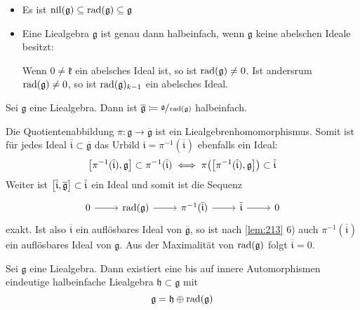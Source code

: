 \begin{bemerkung*}
	\begin{itemize}
		\item Es ist $\nil(\mathfrak{g}) \subseteq \rad(\mathfrak{g}) \subseteq \mathfrak{g}$
		\item Eine Liealgebra $\mathfrak{g}$ ist genau dann halbeinfach, wenn $\mathfrak{g}$ keine abelschen Ideale besitzt:
		
		Wenn $0\neq\mathfrak{k}$ ein abelsches Ideal ist, so ist $\rad(\mathfrak{g}) \neq 0$.
		Ist andersrum $\rad(\mathfrak{g})\neq 0$, so ist $\rad(\mathfrak{g})_{k-1}$ ein abelsches Ideal.
	\end{itemize}
\end{bemerkung*}

\begin{proposition}
	Sei $\mathfrak{g}$ eine Liealgebra.
	Dann ist $\overline{\mathfrak{g}} \coloneqq \sfrac{\mathfrak{g}}{\rad(\mathfrak{g})}$ halbeinfach.
\end{proposition}
\begin{beweis}
	Die Quotientenabbildung $\pi \colon \mathfrak{g} \to \overline{\mathfrak{g}}$ ist ein Liealgebrenhomomorphismus.
	Somit ist für jedes Ideal $\overline{\mathfrak{i}} \subset \overline{\mathfrak{g}}$ das Urbild $\mathfrak{i} = \pi^{-1}(\overline{\mathfrak{i}})$ ebenfalls ein Ideal:
	\[
		\benbrace*{\pi^{-1}(\overline{\mathfrak{i}}), \mathfrak{g}} \subset \pi^{-1}(\overline{\mathfrak{i}}) \iff \pi \enbrace*{\benbrace*{\pi^{-1}(\overline{\mathfrak{i}}), \mathfrak{g}}} \subset \overline{\mathfrak{i}}
	\]
	Weiter ist $\benbrace*{\overline{\mathfrak{i}}, \overline{\mathfrak{g}}} \subset \overline{\mathfrak{i}}$ ein Ideal und somit ist die Sequenz
	\[
		\begin{tikzcd}
			0 \rar & \rad(\mathfrak{g}) \rar & \pi^{-1}(\overline{\mathfrak{i}}) \rar &\overline{\mathfrak{i}} \rar & 0
		\end{tikzcd}
	\] 
	exakt.
	Ist also $\overline{\mathfrak{i}}$ ein auflösbares Ideal von $\overline{\mathfrak{g}}$, so ist nach \autoref{lem:213} 6) auch $\pi^{-1}(\overline{\mathfrak{i}})$ ein auflösbares Ideal von $\mathfrak{g}$.
	Aus der Maximalität von $\rad(\mathfrak{g})$ folgt $\overline{\mathfrak{i}}=0$.
\end{beweis}

\begin{satz}[{name={Levi-Mallev}},label=satz:216]
	Sei $\mathfrak{g}$ eine Liealgebra.
	Dann existiert eine bis auf innere Automorphismen eindeutige halbeinfache Liealgebra $\mathfrak{h} \subset \mathfrak{g}$ mit 
	\[
		\mathfrak{g} = \mathfrak{h} \oplus  \rad(\mathfrak{g})
	\]
\end{satz}

